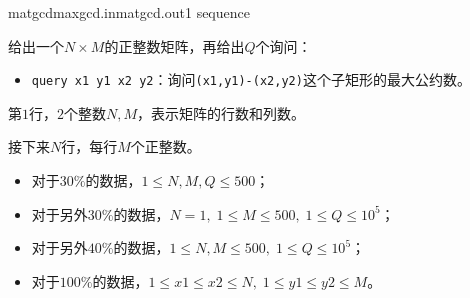 \documentclass[11pt,a4paper,oneside]{article}
\begin{document}
\begin{problem}{matgcd}{maxgcd.in}{matgcd.out}{1 sequence}

    给出一个$N \times M$的正整数矩阵，再给出$Q$个询问：
    \begin{itemize}
    	\item \texttt{query x1 y1 x2 y2}：询问\texttt{(x1,y1)-(x2,y2)}这个子矩形的最大公约数。
    \end{itemize}

    \InputFile

    第$1$行，$2$个整数$N, M$，表示矩阵的行数和列数。

    接下来$N$行，每行$M$个正整数。

    \OutputFile

    \Example

    \begin{example}
    \end{example}

    \Note
    \begin{itemize}
        \item 对于$30\%$的数据，$1 \leq N, M, Q \leq 500$；
        \item 对于另外$30\%$的数据，$N = 1, \; 1 \leq M \leq 500, \; 1 \leq Q \leq 10^5$；
        \item 对于另外$40\%$的数据，$1 \leq N, M \leq 500, \; 1 \leq Q \leq 10^5$；
        \item 对于$100\%$的数据，$1 \leq x1 \leq x2 \leq N, \; 1 \leq y1 \leq y2 \leq M$。
    \end{itemize}

\end{problem}
\end{document}

